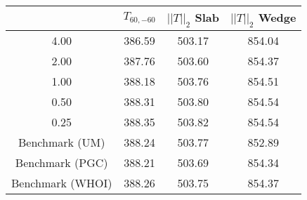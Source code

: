 \begin{tabular}{c|ccc}
    & $T_{60,-60}$ & $||T||_2$ Slab & $||T||_2$ Wedge \\
\hline
4.00 & 386.59 & 503.17 & 854.04 \\
2.00 & 387.76 & 503.60 & 854.37 \\
1.00 & 388.18 & 503.76 & 854.51 \\
0.50 & 388.31 & 503.80 & 854.54 \\
0.25 & 388.35 & 503.82 & 854.54 \\
\hline
Benchmark (UM) & 388.24 & 503.77 & 852.89 \\
Benchmark (PGC) & 388.21 & 503.69 & 854.34 \\
Benchmark (WHOI) & 388.26 & 503.75 & 854.37 \\
\end{tabular}
